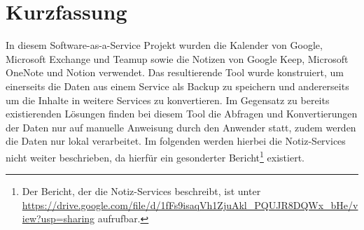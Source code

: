 \section{Kurzfassung}
In diesem Software-as-a-Service Projekt wurden die Kalender von Google, Microsoft Exchange und Teamup sowie die Notizen von Google Keep, Microsoft OneNote und Notion verwendet. Das resultierende Tool wurde konstruiert, um einerseits die Daten aus einem Service als Backup zu speichern und andererseits um die Inhalte in weitere Services zu konvertieren. Im Gegensatz zu bereits existierenden Lösungen finden bei diesem Tool die Abfragen und Konvertierungen der Daten nur auf manuelle Anweisung durch den Anwender statt, zudem werden die Daten nur lokal verarbeitet.
Im folgenden werden hierbei die Notiz-Services nicht weiter beschrieben, da hierfür ein gesonderter Bericht\footnote{Der Bericht, der die Notiz-Services beschreibt, ist unter \url{https://drive.google.com/file/d/1fFs9isaqVh1ZjuAkl_PQUJR8DQWx_bHe/view?usp=sharing} aufrufbar.} existiert.
